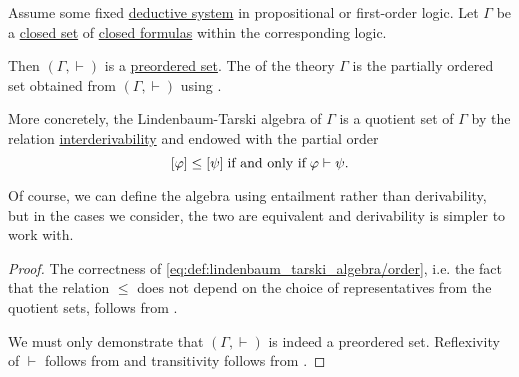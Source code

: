 \begin{definition}\label{def:lindenbaum_tarski_algebra}
  Assume some fixed \hyperref[def:deductive_system]{deductive system} in propositional or first-order logic. Let \( \Gamma \) be a \hyperref[def:first_order_theory]{closed set} of \hyperref[def:first_order_syntax/ground_formula]{closed formulas} within the corresponding logic.

  Then \( (\Gamma, \vdash) \) is a \hyperref[def:preordered_set]{preordered set}. The  of the theory \( \Gamma \) is the partially ordered set obtained from \( (\Gamma, \vdash) \) using .

  More concretely, the Lindenbaum-Tarski algebra of \( \Gamma \) is a quotient set of \( \Gamma \) by the relation \hyperref[def:proof_derivability]{interderivability} and endowed with the partial order
  \begin{equation}\label{eq:def:lindenbaum_tarski_algebra/order}
    [\varphi] \leq [\psi] \T{if and only if} \varphi \vdash \psi.
  \end{equation}

  Of course, we can define the algebra using entailment rather than derivability, but in the cases we consider, the two are equivalent and derivability is simpler to work with.
\end{definition}
\begin{proof}
  The correctness of \eqref{eq:def:lindenbaum_tarski_algebra/order}, i.e. the fact that the relation \( \leq \) does not depend on the choice of representatives from the quotient sets, follows from .

  We must only demonstrate that \( (\Gamma, \vdash) \) is indeed a preordered set. Reflexivity of \( \vdash \) follows from  and transitivity follows from .
\end{proof}

